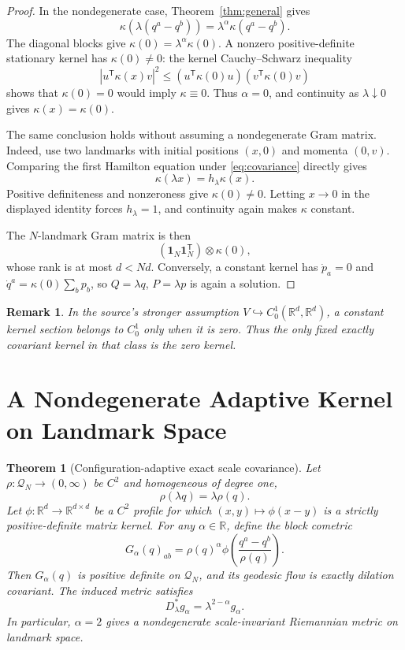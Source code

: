 \documentclass[11pt]{article}
\newtheorem{theorem}{Theorem}
\newtheorem{remark}{Remark}
\newcommand{\R}{\mathbb{R}}
\newcommand{\Q}{\mathcal{Q}}
\newcommand{\one}{\mathbf{1}}
\newcommand{\kron}{\mathbin{\otimes}}
\begin{document}
\begin{proof}
In the nondegenerate case, Theorem~\ref{thm:general} gives
\[
 \kappa(\lambda(q^a-q^b))
 =\lambda^\alpha\kappa(q^a-q^b).
\]
The diagonal blocks give
\(\kappa(0)=\lambda^\alpha\kappa(0)\).  A nonzero positive-definite
stationary kernel has \(\kappa(0)\neq0\): the kernel Cauchy--Schwarz
inequality
\[
 |u^{\mathsf T}\kappa(x)v|^2
 \leq
 (u^{\mathsf T}\kappa(0)u)(v^{\mathsf T}\kappa(0)v)
\]
shows that \(\kappa(0)=0\) would imply \(\kappa\equiv0\).
Thus \(\alpha=0\), and continuity as \(\lambda\downarrow0\) gives
\(\kappa(x)=\kappa(0)\).

The same conclusion holds without assuming a nondegenerate Gram matrix.
Indeed, use two landmarks with initial positions \((x,0)\) and momenta
\((0,v)\).  Comparing the first Hamilton equation under
\eqref{eq:covariance} directly gives
\[
 \kappa(\lambda x)=h_\lambda\kappa(x).
\]
Positive definiteness and nonzeroness give \(\kappa(0)\neq0\).  Letting
\(x\to0\) in the displayed identity forces \(h_\lambda=1\), and
continuity again makes \(\kappa\) constant.

The \(N\)-landmark Gram matrix is then
\[
  (\one_N\one_N^{\mathsf T})\kron\kappa(0),
\]
whose rank is at most \(d<Nd\).  Conversely, a constant kernel has
\(\dot p_a=0\) and
\(\dot q^a=\kappa(0)\sum_b p_b\), so
\(Q=\lambda q\), \(P=\lambda p\) is again a solution.
\end{proof}

\begin{remark}
In the source's stronger assumption \(V\hookrightarrow
C_0^1(\R^d,\R^d)\), a constant kernel section belongs to \(C_0^1\) only
when it is zero.  Thus the only fixed exactly covariant kernel in that
class is the zero kernel.
\end{remark}

\section*{A Nondegenerate Adaptive Kernel on Landmark Space}

\begin{theorem}[Configuration-adaptive exact scale covariance]
\label{thm:adaptive}
Let \(\rho:\Q_N\to(0,\infty)\) be \(C^2\) and homogeneous of degree one,
\[
 \rho(\lambda q)=\lambda\rho(q).
\]
Let \(\phi:\R^d\to\R^{d\times d}\) be a \(C^2\) profile for which
\((x,y)\mapsto\phi(x-y)\) is a strictly positive-definite matrix kernel.  For any
\(\alpha\in\R\), define the block cometric
\begin{equation}
 G_\alpha(q)_{ab}
 =\rho(q)^\alpha
 \phi\!\left(\frac{q^a-q^b}{\rho(q)}\right).
 \label{eq:adaptive}
\end{equation}
Then \(G_\alpha(q)\) is positive definite on \(\Q_N\), and its geodesic
flow is exactly dilation covariant.  The induced metric satisfies
\[
 D_\lambda^*g_\alpha=\lambda^{2-\alpha}g_\alpha.
\]
In particular, \(\alpha=2\) gives a nondegenerate scale-invariant
Riemannian metric on landmark space.
\end{theorem}
\end{document}
